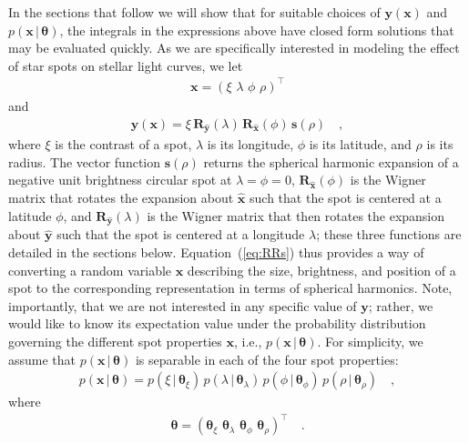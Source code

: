 \documentclass[modern]{aastex62}
\begin{document}
In the sections that follow we will show that for suitable choices of $\mathbf{y}(\mathbf{x})$
and $p(\mathbf{x} \, \big| \, \pmb{\theta})$, the integrals in the expressions
above have closed form solutions that may be evaluated quickly.
%
As we are specifically interested in modeling the effect of star spots
on stellar light curves, we let
%
\begin{align}
    \mathbf{x} = \left( \xi \,\, \lambda \,\, \phi \,\, \rho \right)^\top
\end{align}
%
and
%
\begin{align}
    \label{eq:RRs}
    \mathbf{y}(\mathbf{x}) =
    \xi
    \,
    \mathbf{R}_{\hat{\mathbf{y}}}(\lambda)
    \,
    \mathbf{R}_{\hat{\mathbf{x}}}(\phi)
    \,
    \mathbf{s}(\rho)
    \quad,
\end{align}
%
where $\xi$ is the contrast of a spot,
$\lambda$ is its longitude, $\phi$ is its latitude,
and $\rho$ is its radius.
The vector function $\mathbf{s}(\rho)$
returns the spherical harmonic expansion of a negative unit brightness
circular spot at $\lambda = \phi = 0$,
$\mathbf{R}_{\hat{\mathbf{x}}}(\phi)$ is the Wigner matrix that rotates the
expansion about $\hat{\mathbf{x}}$ such that the spot is centered at a
latitude $\phi$, and $\mathbf{R}_{\hat{\mathbf{y}}}(\lambda)$ is the Wigner
matrix that then rotates the
expansion about $\hat{\mathbf{y}}$ such that the spot is centered at a
longitude $\lambda$; these three functions are detailed in the sections below.
%
Equation~(\ref{eq:RRs}) thus provides a way of converting a random variable
$\mathbf{x}$ describing the size, brightness, and position of a spot to the
corresponding representation in terms of spherical harmonics.
%
Note, importantly, that we are not interested in any specific value of
$\mathbf{y}$; rather, we would like to know its expectation value under
the probability distribution governing the different spot properties $\mathbf{x}$,
i.e., $p(\mathbf{x} \, \big| \, \pmb{\theta})$.
%
For simplicity, we assume that $p(\mathbf{x} \, \big| \, \pmb{\theta})$
is separable in each of the four spot properties:
%
\begin{align}
    p(\mathbf{x} \, \big| \, \pmb{\theta})
    =
    p(\xi \, \big| \, \pmb{\theta}_{\xi}) \,
    p(\lambda \, \big| \, \pmb{\theta}_{\lambda}) \,
    p(\phi \, \big| \, \pmb{\theta}_{\phi})\,
    p(\rho \, \big| \, \pmb{\theta}_{\rho})
    \quad,
\end{align}
%
where
%
\begin{align}
    \pmb{\theta} = \left(
    \pmb{\theta}_{\xi} \, \,
    \pmb{\theta}_{\lambda} \, \,
    \pmb{\theta}_{\phi} \, \,
    \pmb{\theta}_{\rho} \right)^\top
    \quad.
\end{align}
\end{document}
